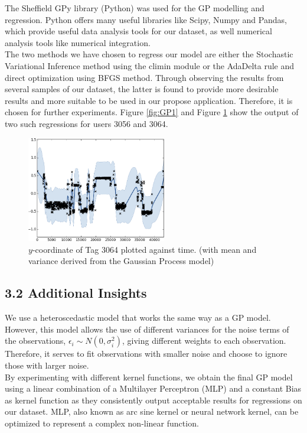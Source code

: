 \documentclass[letterpaper]{article}
\begin{document}
The Sheffield GPy library (Python) was used for the GP modelling and regression. Python offers many useful libraries like Scipy, Numpy and Pandas, which provide useful data analysis tools for our dataset, as well numerical analysis tools like numerical integration.\\

The two methods we have chosen to regress our model are either the Stochastic Variational Inference method using the climin module or the AdaDelta rule and direct optimization using BFGS method. Through observing the results from several samples of our dataset, the latter is found to provide more desirable results and more suitable to be used in our propose application. Therefore, it is chosen for further experiments. Figure \ref{fig:GP1} and Figure \ref{fig:GP2} show the output of two such regressions for users 3056 and 3064.

\begin{figure}[h!]
  \centering
    \includegraphics[width=230px,natwidth=665,natheight=391]{selected_GP/3064.csv_Y.png}
  \caption{$y$-coordinate of Tag 3064 plotted against time. (with mean and variance derived from the Gaussian Process model)}
  \label{fig:GP2}
\end{figure}

\subsection{3.2  Additional Insights}

We use a heteroscedastic model that works the same way as a GP model. However, this model allows the use of different variances for the noise terms of the observations, $\epsilon_i \sim N(0, \sigma_i^2)$, giving different weights to each observation. Therefore, it serves to fit observations with smaller noise and choose to ignore those with larger noise. \\

By experimenting with different kernel functions, we obtain the final GP model using a linear combination of a Multilayer Perceptron (MLP) and a constant Bias as kernel function as they consistently output acceptable results for regressions on our dataset. MLP, also known as arc sine kernel or neural network kernel, can be optimized to represent a complex non-linear function. \\
\end{document}
